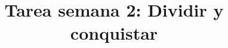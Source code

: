 \documentclass{doc}
\title{Tarea semana 2: Dividir y conquistar}
\begin{document}
\makedocheader



\end{document}
